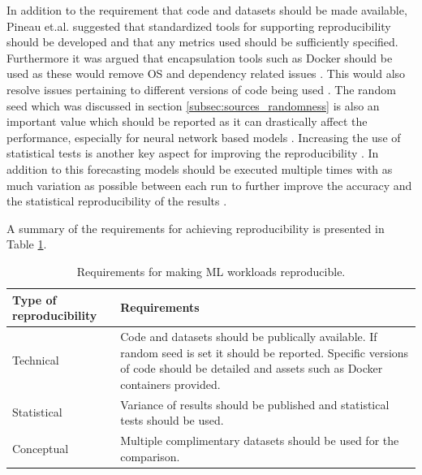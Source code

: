 In addition to the requirement that code and datasets should be made available, Pineau et.al. suggested that standardized tools for supporting reproducibility should be developed and that any metrics used should be sufficiently specified. Furthermore it was argued that encapsulation tools such as Docker should be used as these would remove OS and dependency related issues \cite{pineau2020improving}. This would also resolve issues pertaining to different versions of code being used \cite{beam2020challenges}. The random seed which was discussed in section \ref{subsec:sources_randomness} is also an important value which should be reported as it can drastically affect the performance, especially for neural network based models \cite{beam2020challenges, bouthillier2021accounting}. Increasing the use of statistical tests is another key aspect for improving the reproducibility \cite{mcdermott2019reproducibility}. In addition to this forecasting models should be executed multiple times with as much variation as possible between each run to further improve the accuracy and the statistical reproducibility of the results
\cite{bouthillier2021accounting}.

A summary of the requirements for achieving reproducibility is presented in Table \ref{tab:reproducibility}.

\begin{table}[h]
  \centering
  \begin{tabularx}{\textwidth}{|l|X|}
    \hline
    Type of reproducibility & Requirements                                                                                                                                                                               \\
    \hline
    \hline
    Technical               & Code and datasets should be publically available. If random seed is set it should be reported. Specific versions of code should be detailed and assets such as Docker containers provided. \\
    \hline
    Statistical             & Variance of results should be published and statistical tests should be used.                                                                                                              \\
    \hline
    Conceptual              & Multiple complimentary datasets should be used for the comparison.                                                                                                                         \\
    \hline
  \end{tabularx}
  \caption{Requirements for making ML workloads reproducible.}
  \label{tab:reproducibility}
\end{table}


